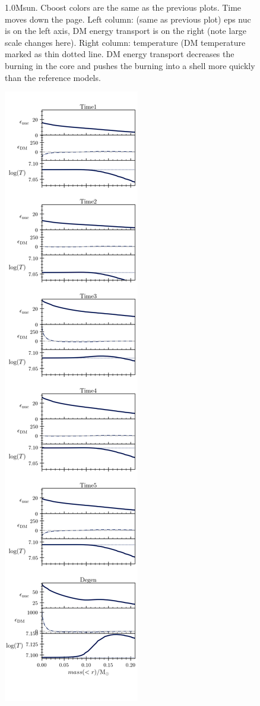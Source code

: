 \documentclass[useAMS,usenatbib]{mnras}
\begin{document}
\begin{figure}
    \caption{1.0Msun. Cboost colors are the same as the previous plots. Time moves down the page. Left column: (same as previous plot) eps nuc is on the left axis, DM energy transport is on the right (note large scale changes here). Right column: temperature (DM temperature marked as thin dotted line.
    DM energy transport decreases the burning in the core and pushes the burning into a shell more quickly than the reference models.
    }
    \label{fig:m1p0_a}
  \end{figure}

  \begin{figure}
    \centering
    \includegraphics[width=\textwidth]{plots/m1p0c6.png}

\end{figure}
\end{document}
